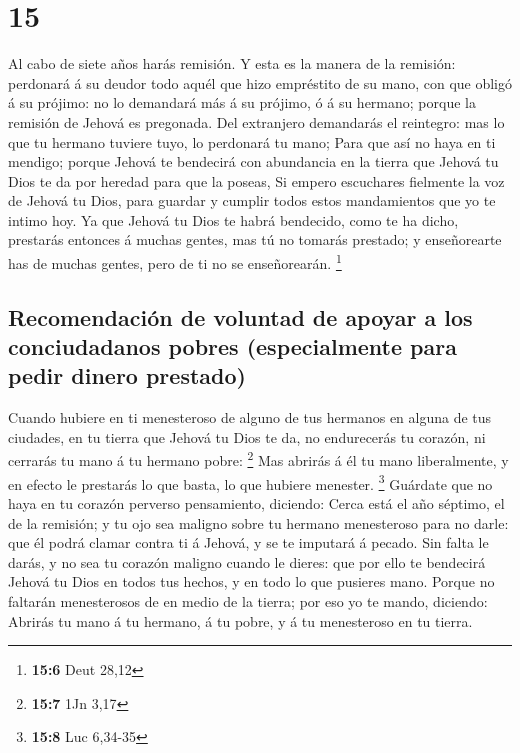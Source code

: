 \hypertarget{section-14}{%
\section{15}\label{section-14}}

 Al cabo de siete años harás remisión.  Y esta
es la manera de la remisión: perdonará á su deudor todo aquél que hizo
empréstito de su mano, con que obligó á su prójimo: no lo demandará más
á su prójimo, ó á su hermano; porque la remisión de Jehová es pregonada.
 Del extranjero demandarás el reintegro: mas lo que tu
hermano tuviere tuyo, lo perdonará tu mano;  Para que así no
haya en ti mendigo; porque Jehová te bendecirá con abundancia en la
tierra que Jehová tu Dios te da por heredad para que la poseas,
 Si empero escuchares fielmente la voz de Jehová tu Dios,
para guardar y cumplir todos estos mandamientos que yo te intimo hoy.
 Ya que Jehová tu Dios te habrá bendecido, como te ha dicho,
prestarás entonces á muchas gentes, mas tú no tomarás prestado; y
enseñorearte has de muchas gentes, pero de ti no se enseñorearán.
\footnote{\textbf{15:6} Deut 28,12}

\hypertarget{recomendaciuxf3n-de-voluntad-de-apoyar-a-los-conciudadanos-pobres-especialmente-para-pedir-dinero-prestado}{%
\subsection{Recomendación de voluntad de apoyar a los conciudadanos
pobres (especialmente para pedir dinero
prestado)}\label{recomendaciuxf3n-de-voluntad-de-apoyar-a-los-conciudadanos-pobres-especialmente-para-pedir-dinero-prestado}}

 Cuando hubiere en ti menesteroso de alguno de tus hermanos
en alguna de tus ciudades, en tu tierra que Jehová tu Dios te da, no
endurecerás tu corazón, ni cerrarás tu mano á tu hermano pobre:
\footnote{\textbf{15:7} 1Jn 3,17}  Mas abrirás á él tu mano
liberalmente, y en efecto le prestarás lo que basta, lo que hubiere
menester. \footnote{\textbf{15:8} Luc 6,34-35}  Guárdate que
no haya en tu corazón perverso pensamiento, diciendo: Cerca está el año
séptimo, el de la remisión; y tu ojo sea maligno sobre tu hermano
menesteroso para no darle: que él podrá clamar contra ti á Jehová, y se
te imputará á pecado.  Sin falta le darás, y no sea tu
corazón maligno cuando le dieres: que por ello te bendecirá Jehová tu
Dios en todos tus hechos, y en todo lo que pusieres mano. 
Porque no faltarán menesterosos de en medio de la tierra; por eso yo te
mando, diciendo: Abrirás tu mano á tu hermano, á tu pobre, y á tu
menesteroso en tu tierra.


